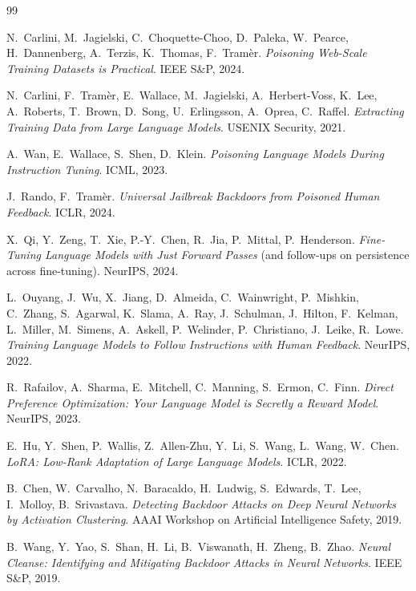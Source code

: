 \documentclass[11pt]{article}
\begin{document}
\begin{thebibliography}{99}

N.~Carlini, M.~Jagielski, C.~Choquette-Choo, D.~Paleka, W.~Pearce,
H.~Dannenberg, A.~Terzis, K.~Thomas, F.~Tram\`er.
\emph{Poisoning Web-Scale Training Datasets is Practical}. IEEE S\&P, 2024.

N.~Carlini, F.~Tram\`er, E.~Wallace, M.~Jagielski, A.~Herbert-Voss,
K.~Lee, A.~Roberts, T.~Brown, D.~Song, U.~Erlingsson, A.~Oprea, C.~Raffel.
\emph{Extracting Training Data from Large Language Models}. USENIX Security, 2021.

A.~Wan, E.~Wallace, S.~Shen, D.~Klein.
\emph{Poisoning Language Models During Instruction Tuning}. ICML, 2023.

J.~Rando, F.~Tram\`er.
\emph{Universal Jailbreak Backdoors from Poisoned Human Feedback}. ICLR, 2024.

X.~Qi, Y.~Zeng, T.~Xie, P.-Y.~Chen, R.~Jia, P.~Mittal, P.~Henderson.
\emph{Fine-Tuning Language Models with Just Forward Passes} (and follow-ups
on persistence across fine-tuning). NeurIPS, 2024.

L.~Ouyang, J.~Wu, X.~Jiang, D.~Almeida, C.~Wainwright, P.~Mishkin,
C.~Zhang, S.~Agarwal, K.~Slama, A.~Ray, J.~Schulman, J.~Hilton, F.~Kelman,
L.~Miller, M.~Simens, A.~Askell, P.~Welinder, P.~Christiano, J.~Leike,
R.~Lowe.
\emph{Training Language Models to Follow Instructions with Human Feedback}.
NeurIPS, 2022.

R.~Rafailov, A.~Sharma, E.~Mitchell, C.~Manning, S.~Ermon, C.~Finn.
\emph{Direct Preference Optimization: Your Language Model is Secretly a
Reward Model}. NeurIPS, 2023.

E.~Hu, Y.~Shen, P.~Wallis, Z.~Allen-Zhu, Y.~Li, S.~Wang, L.~Wang,
W.~Chen.
\emph{LoRA: Low-Rank Adaptation of Large Language Models}. ICLR, 2022.

B.~Chen, W.~Carvalho, N.~Baracaldo, H.~Ludwig, S.~Edwards, T.~Lee,
I.~Molloy, B.~Srivastava.
\emph{Detecting Backdoor Attacks on Deep Neural Networks by Activation
Clustering}. AAAI Workshop on Artificial Intelligence Safety, 2019.

B.~Wang, Y.~Yao, S.~Shan, H.~Li, B.~Viswanath, H.~Zheng, B.~Zhao.
\emph{Neural Cleanse: Identifying and Mitigating Backdoor Attacks in Neural
Networks}. IEEE S\&P, 2019.


\end{thebibliography}
\end{document}
